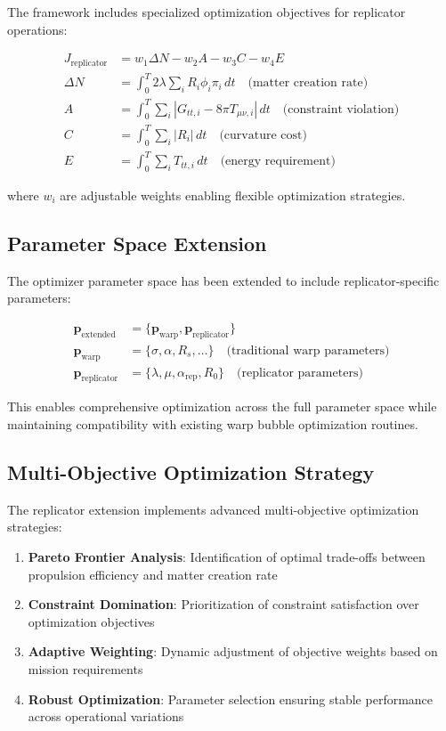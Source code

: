 \documentclass[11pt]{article}
\begin{document}
The framework includes specialized optimization objectives for replicator operations:

\begin{align}
J_{\text{replicator}} &= w_1 \Delta N - w_2 A - w_3 C - w_4 E \\
\Delta N &= \int_0^T 2\lambda \sum_i R_i \phi_i \pi_i \, dt \quad \text{(matter creation rate)} \\
A &= \int_0^T \sum_i |G_{tt,i} - 8\pi T_{\mu\nu,i}| \, dt \quad \text{(constraint violation)} \\
C &= \int_0^T \sum_i |R_i| \, dt \quad \text{(curvature cost)} \\
E &= \int_0^T \sum_i T_{tt,i} \, dt \quad \text{(energy requirement)}
\end{align}

where $w_i$ are adjustable weights enabling flexible optimization strategies.

\subsection{Parameter Space Extension}

The optimizer parameter space has been extended to include replicator-specific parameters:

\begin{align}
\mathbf{p}_{\text{extended}} &= \{\mathbf{p}_{\text{warp}}, \mathbf{p}_{\text{replicator}}\} \\
\mathbf{p}_{\text{warp}} &= \{\sigma, \alpha, R_s, \ldots\} \quad \text{(traditional warp parameters)} \\
\mathbf{p}_{\text{replicator}} &= \{\lambda, \mu, \alpha_{\text{rep}}, R_0\} \quad \text{(replicator parameters)}
\end{align}

This enables comprehensive optimization across the full parameter space while maintaining compatibility with existing warp bubble optimization routines.

\subsection{Multi-Objective Optimization Strategy}

The replicator extension implements advanced multi-objective optimization strategies:

\begin{enumerate}
\item \textbf{Pareto Frontier Analysis}: Identification of optimal trade-offs between propulsion efficiency and matter creation rate
\item \textbf{Constraint Domination}: Prioritization of constraint satisfaction over optimization objectives
\item \textbf{Adaptive Weighting}: Dynamic adjustment of objective weights based on mission requirements
\item \textbf{Robust Optimization}: Parameter selection ensuring stable performance across operational variations
\end{enumerate}
\end{document}
